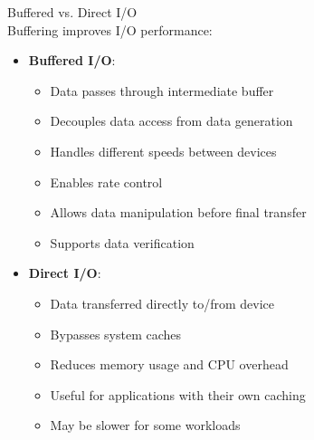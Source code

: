 \begin{definition}{Buffered vs. Direct I/O}\\
    Buffering improves I/O performance:
    \begin{itemize}
        \item \textbf{Buffered I/O}:
            \begin{itemize}
                \item Data passes through intermediate buffer
                \item Decouples data access from data generation
                \item Handles different speeds between devices
                \item Enables rate control
                \item Allows data manipulation before final transfer
                \item Supports data verification
            \end{itemize}
        \item \textbf{Direct I/O}:
            \begin{itemize}
                \item Data transferred directly to/from device
                \item Bypasses system caches
                \item Reduces memory usage and CPU overhead
                \item Useful for applications with their own caching
                \item May be slower for some workloads
            \end{itemize}
    \end{itemize}
\end{definition}

